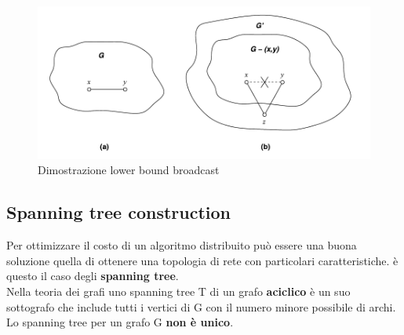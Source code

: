 \documentclass[12pt]{article}
\begin{document}
			\begin{figure}[h!]
				\centering
				\includegraphics[scale=0.35]{img/lower.png}
				\caption{Dimostrazione lower bound broadcast}
			\end{figure}
			
			
	\subsection{Spanning tree construction}
		Per ottimizzare il costo di un algoritmo distribuito può essere una buona soluzione quella di ottenere una topologia di rete con particolari caratteristiche. è questo il caso degli \textbf{spanning tree}.\\
		Nella teoria dei grafi uno spanning tree T di un grafo \textbf{aciclico} è un suo sottografo che include tutti i vertici di G con il numero minore possibile di archi. Lo spanning tree per un grafo G \textbf{non è unico}.
\end{document}
